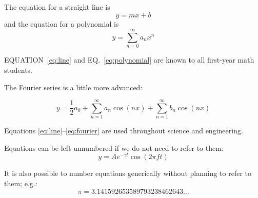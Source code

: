 \providecommand{\crefname}[3]{}
\providecommand{\Crefname}[3]{}
\crefname{equation}{EQ.}{eqs.}
\Crefname{equation}{EQUATION}{Equations}
\providecommand{\creflabelformat}[2]{}{}
\creflabelformat{equation}{#1#2#3}

\providecommand{\plusnamesingular}{}
\providecommand{\starnamesingular}{}
\providecommand{\cref}{\plusnamesingular~\ref}
\providecommand{\Cref}{\starnamesingular~\ref}

The equation for a straight line is
\begin{equation} y = mx + b \label{eq:line}\end{equation} and the
equation for a polynomial is
\begin{equation} y = \sum_{n=0}^{\infty} a_n x^n \label{eq:polynomial}\end{equation}

\renewcommand{\starnamesingular}{EQUATION}\Cref{eq:line} and
\renewcommand{\plusnamesingular}{EQ.}\cref{eq:polynomial} are known to
all first-year math students.

The Fourier series is a little more advanced:

\begin{equation} y = \frac{1}{2}a_0 + \sum_{n=1}^{\infty}a_n\cos(nx)
                      + \sum_{n=1}^{\infty}b_n\cos(nx)
\label{eq:fourier}\end{equation}

Equations \ref{eq:line}--\ref{eq:fourier} are used throughout science
and engineering.

Equations can be left unnumbered if we do not need to refer to them:
\[ y = A e^{-\gamma t}\cos(2\pi f t) \]

It is also possible to number equations generically without planning to
refer to them; e.g.:
\begin{equation} \pi = 3.141592653589793238462643\dots \label{eq:b4a2bc15-d8f5-4607-b654-a4a17e682f8a}\end{equation}

